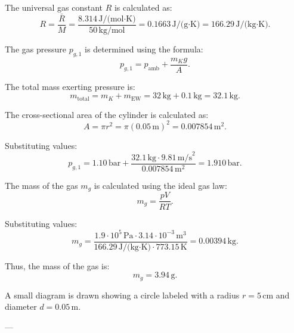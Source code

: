 The universal gas constant \( R \) is calculated as:  
\[
R = \frac{\bar{R}}{M} = \frac{8.314 \, \text{J/(mol·K)}}{50 \, \text{kg/mol}} = 0.1663 \, \text{J/(g·K)} = 166.29 \, \text{J/(kg·K)}.
\]

The gas pressure \( p_{g,1} \) is determined using the formula:  
\[
p_{g,1} = p_{\text{amb}} + \frac{m_K g}{A}.
\]

The total mass exerting pressure is:  
\[
m_{\text{total}} = m_K + m_{\text{EW}} = 32 \, \text{kg} + 0.1 \, \text{kg} = 32.1 \, \text{kg}.
\]

The cross-sectional area of the cylinder is calculated as:  
\[
A = \pi r^2 = \pi (0.05 \, \text{m})^2 = 0.007854 \, \text{m}^2.
\]

Substituting values:  
\[
p_{g,1} = 1.10 \, \text{bar} + \frac{32.1 \, \text{kg} \cdot 9.81 \, \text{m/s}^2}{0.007854 \, \text{m}^2} = 1.910 \, \text{bar}.
\]

The mass of the gas \( m_g \) is calculated using the ideal gas law:  
\[
m_g = \frac{p V}{R T}.
\]

Substituting values:  
\[
m_g = \frac{1.9 \cdot 10^5 \, \text{Pa} \cdot 3.14 \cdot 10^{-3} \, \text{m}^3}{166.29 \, \text{J/(kg·K)} \cdot 773.15 \, \text{K}} = 0.00394 \, \text{kg}.
\]

Thus, the mass of the gas is:  
\[
m_g = 3.94 \, \text{g}.
\]

A small diagram is drawn showing a circle labeled with a radius \( r = 5 \, \text{cm} \) and diameter \( d = 0.05 \, \text{m} \).

---